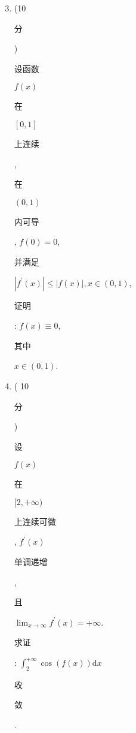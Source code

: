 \documentclass[10pt]{article}
\begin{document}
\begin{enumerate}
  \setcounter{enumi}{2}
  \item (10 \begin{CJK}{UTF8}{mj}分\end{CJK}) \begin{CJK}{UTF8}{mj}设函数\end{CJK} $f(x)$ \begin{CJK}{UTF8}{mj}在\end{CJK} $[0,1]$ \begin{CJK}{UTF8}{mj}上连续\end{CJK}, \begin{CJK}{UTF8}{mj}在\end{CJK} $(0,1)$ \begin{CJK}{UTF8}{mj}内可导\end{CJK}, $f(0)=0$, \begin{CJK}{UTF8}{mj}并满足\end{CJK} $\left|f^{\prime}(x)\right| \leqslant|f(x)|, x \in(0,1)$, \begin{CJK}{UTF8}{mj}证明\end{CJK}: $f(x) \equiv 0$, \begin{CJK}{UTF8}{mj}其中\end{CJK} $x \in(0,1)$.

  \item ( 10 \begin{CJK}{UTF8}{mj}分\end{CJK}) \begin{CJK}{UTF8}{mj}设\end{CJK} $f(x)$ \begin{CJK}{UTF8}{mj}在\end{CJK} $[2,+\infty)$ \begin{CJK}{UTF8}{mj}上连续可微\end{CJK}, $f^{\prime}(x)$ \begin{CJK}{UTF8}{mj}单调递增\end{CJK}, \begin{CJK}{UTF8}{mj}且\end{CJK} $\lim _{x \rightarrow \infty} f^{\prime}(x)=+\infty$. \begin{CJK}{UTF8}{mj}求证\end{CJK}: $\int_{2}^{+\infty} \cos (f(x)) \mathrm{d} x$ \begin{CJK}{UTF8}{mj}收\end{CJK} \begin{CJK}{UTF8}{mj}敛\end{CJK}.


\end{enumerate}
\end{document}
